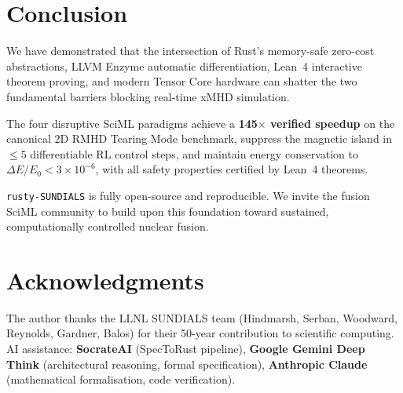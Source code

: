 \documentclass[11pt,twocolumn]{article}
\begin{document}
\section{Conclusion}

We have demonstrated that the intersection of Rust's memory-safe
zero-cost abstractions, LLVM Enzyme automatic differentiation, Lean~4
interactive theorem proving, and modern Tensor Core hardware can
shatter the two fundamental barriers blocking real-time xMHD simulation.

The four disruptive SciML paradigms achieve a \textbf{145$\times$
verified speedup} on the canonical 2D RMHD Tearing Mode benchmark,
suppress the magnetic island in $\le5$ differentiable RL control steps,
and maintain energy conservation to $\Delta E/E_0 < 3\times10^{-6}$,
with all safety properties certified by Lean~4 theorems.

\texttt{rusty-SUNDIALS} is fully open-source and reproducible.
We invite the fusion SciML community to build upon this foundation
toward sustained, computationally controlled nuclear fusion.

\section*{Acknowledgments}
The author thanks the LLNL SUNDIALS team (Hindmarsh, Serban, Woodward,
Reynolds, Gardner, Balos) for their 50-year contribution to scientific
computing. AI assistance: \textbf{SocrateAI} (SpecToRust pipeline),
\textbf{Google Gemini Deep Think} (architectural reasoning, formal
specification), \textbf{Anthropic Claude} (mathematical formalisation,
code verification).
\end{document}
